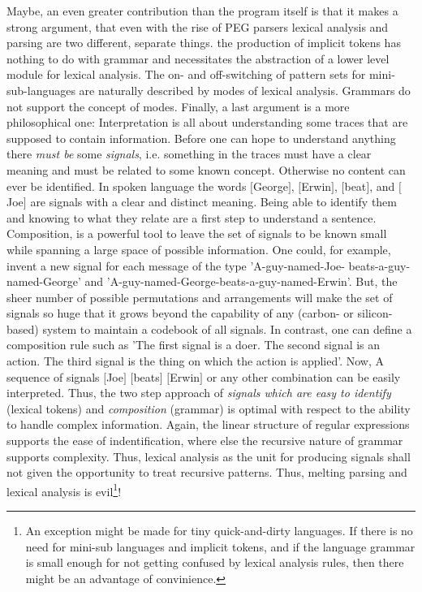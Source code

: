 Maybe, an even greater contribution than the program itself is that it makes a
strong argument, that even with the rise of PEG parsers lexical analysis and
parsing are two different, separate things. the production of implicit tokens
has nothing to do with grammar and necessitates the abstraction of a lower
level module for lexical analysis. The on- and off-switching of pattern sets
for mini-sub-languages are naturally described by modes of lexical analysis.
Grammars do not support the concept of modes. Finally, a last argument is a
more philosophical one: Interpretation is all about understanding some traces
that are supposed to contain information.  Before one can hope to understand
anything there {\it must be} some {\it signals}, i.e. something in the traces
must have a clear meaning and must be related to some known concept. Otherwise
no content can ever be identified.  In spoken language the words $[$George$]$,
$[$Erwin$]$, $[$beat$]$, and $[$Joe$]$ are signals with a clear and distinct
meaning. Being able to identify them and knowing to what they relate are a
first step to understand a sentence.  Composition, is a powerful tool to leave
the set of signals to be known small while spanning a large space of possible
information. One could, for example, invent a new signal for each message of
the type 'A-guy-named-Joe- beats-a-guy-named-George' and
'A-guy-named-George-beats-a-guy-named-Erwin'.  But, the sheer number of
possible permutations and arrangements will make the set of signals so huge
that it grows beyond the capability of any (carbon- or silicon-based) system
to maintain a codebook of all signals. In contrast, one can define a
composition rule such as 'The first signal is a doer. The second signal is an
action. The third signal is the thing on which the action is applied'. Now, A
sequence of signals $[$Joe$]$ $[$beats$]$ $[$Erwin$]$ or any other combination
can be easily interpreted. Thus, the two step approach of {\it signals which
  are easy to identify} (lexical tokens) and {\it composition} (grammar) is
optimal with respect to the ability to handle complex information. Again, the
linear structure of regular expressions supports the ease of indentification,
where else the recursive nature of grammar supports complexity. Thus, lexical
analysis as the unit for producing signals shall not given the opportunity to
treat recursive patterns. Thus, melting parsing and lexical analysis is
evil\footnote{An exception might be made for tiny quick-and-dirty languages.
  If there is no need for mini-sub languages and implicit tokens, and if the
  language grammar is small enough for not getting confused by lexical
  analysis rules, then there might be an advantage of convinience.}!


